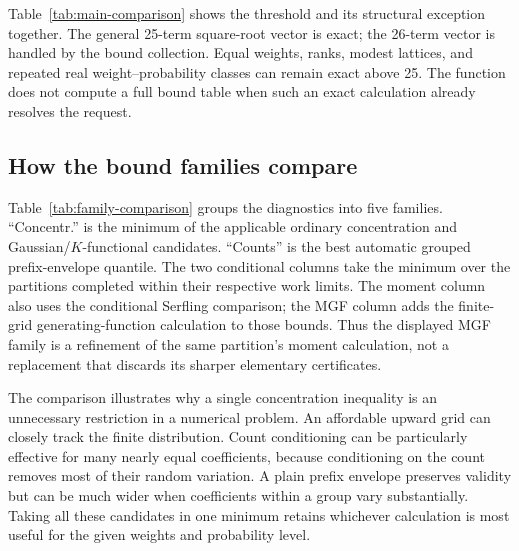 \documentclass[11pt,letterpaper]{article}
\numberwithin{equation}{section}
\theoremstyle{definition}
\theoremstyle{remark}
\begin{document}
\begin{table}[htbp]
\centering
\footnotesize
\setlength{\tabcolsep}{3.2pt}

\caption{Actual returned $0.95$ quantiles under the default dispatch rule.
The reference column contains independently computed finite-law quantiles
where available. ``Exact'' describes the selected finite-distribution
algorithm; it does not claim symbolic arithmetic.}
\label{tab:main-comparison}
\end{table}

Table~\ref{tab:main-comparison} shows the threshold and its structural
exception together. The general 25-term square-root vector is exact;
the 26-term vector is handled by the bound collection. Equal weights,
ranks, modest lattices, and repeated real weight--probability classes can
remain exact above 25. The function does not compute a full bound table
when such an exact calculation already resolves the request.

\subsection{How the bound families compare}

Table~\ref{tab:family-comparison} groups the diagnostics into five
families. ``Concentr.'' is the minimum of the applicable ordinary
concentration and Gaussian/$K$-functional candidates. ``Counts'' is the
best automatic grouped prefix-envelope quantile. The two conditional
columns take the minimum over the partitions completed within their
respective work limits. The moment column also uses the conditional
Serfling comparison; the MGF column adds the finite-grid generating-function
calculation to those bounds. Thus the displayed MGF family is a refinement
of the same partition's moment calculation, not a replacement that discards
its sharper elementary certificates.

\begin{table}[htbp]
\centering
\footnotesize
\setlength{\tabcolsep}{3pt}

\caption{Internal family minima at $\alpha=0.05$ for the cases that use the
conservative branch. All entries come from the same default call. The last
column is its returned value. A dash means the family is inapplicable or
was not completed within the work limits.}
\label{tab:family-comparison}
\end{table}

The comparison illustrates why a single concentration inequality is an
unnecessary restriction in a numerical problem. An affordable upward
grid can closely track the finite distribution. Count conditioning can
be particularly effective for many nearly equal coefficients, because
conditioning on the count removes most of their random variation. A
plain prefix envelope preserves validity but can be much wider when
coefficients within a group vary substantially. Taking all these
candidates in one minimum retains whichever calculation is most useful
for the given weights and probability level.
\end{document}
